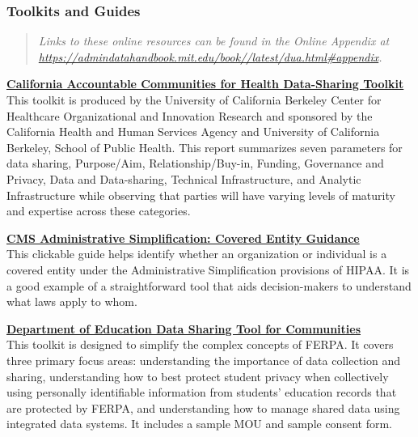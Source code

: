 \hypertarget{toolkits-and-guides}{%
\subsubsection*{Toolkits and Guides}\label{toolkits-and-guides}}

\begin{quote}\itshape
Links to these online resources can be found in the Online Appendix at \url{https://admindatahandbook.mit.edu/book//latest/dua.html#appendix}.
\end{quote}

\textbf{\href{https://cachi.org/uploads/resources/ACH-Data-Sharing-Toolkit-December-2016.pdf}{California Accountable Communities for Health Data-Sharing Toolkit}}\\
This toolkit is produced by the University of California Berkeley Center for Healthcare Organizational and Innovation Research and sponsored by the California Health and Human Services Agency and University of California Berkeley, School of Public Health. This report summarizes seven parameters for data sharing, Purpose/Aim, Relationship/Buy-in, Funding, Governance and Privacy, Data and Data-sharing, Technical Infrastructure, and Analytic Infrastructure while observing that parties will have varying levels of maturity and expertise across these categories.

\textbf{\href{https://www.cms.gov/Regulations-and-Guidance/Administrative-Simplification/HIPAA-ACA/Downloads/CoveredEntitiesChart20160617.pdf}{CMS Administrative Simplification: Covered Entity Guidance}}\\
This clickable guide helps identify whether an organization or individual is a covered entity under the Administrative Simplification provisions of HIPAA. It is a good example of a straightforward tool that aids decision-makers to understand what laws apply to whom.

\textbf{\href{https://www2.ed.gov/programs/promiseneighborhoods/datasharingtool.pdf}{Department of Education Data Sharing Tool for Communities}}\\
This toolkit is designed to simplify the complex concepts of FERPA. It covers three primary focus areas: understanding the importance of data collection and sharing, understanding how to best protect student privacy when collectively using personally identifiable information from students' education records that are protected by FERPA, and understanding how to manage shared data using integrated data systems. It includes a sample MOU and sample consent form.

